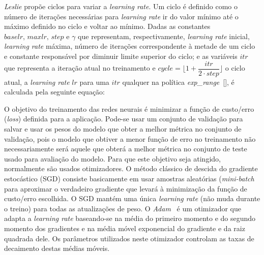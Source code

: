 \textit{Leslie} propõe ciclos para variar a \textit{learning rate}. Um ciclo é definido como o número de iterações necessárias para \textit{learning rate} ir do valor mínimo até o máximo definido no ciclo e voltar ao mínimo. Dadas as constantes $baselr,\, maxlr,\, step \text{ e } \gamma$ que representam, respectivamente, \textit{learning rate} inicial, \textit{learning rate} máxima, número de iterações correspondente à metade de um ciclo e constante responsável por diminuir limite superior do ciclo; e as variáveis $itr$ que representa a iteração atual no treinamento e $cycle = \lfloor 1 + \dfrac{itr}{2 \cdot step} \rfloor$ o ciclo atual, a \textit{learning rate} $lr$ para uma $itr$ qualquer na política \textit{exp\_range}~[], é calculada pela seguinte equação:

O objetivo do treinamento das redes neurais é minimizar a função de custo/erro (\textit{loss}) definida para a aplicação. Pode-se usar um conjunto de validação para salvar e usar os pesos do modelo que obter a melhor métrica no conjunto de validação, pois o modelo que obtiver a menor função de erro no treinamento não necessariamente será aquele que obterá a melhor métrica no conjunto de teste usado para avaliação do modelo. Para que este objetivo seja atingido, normalmente são usados otimizadores. O método clássico de descida do gradiente estocástico (\acrshort{SGD}) consiste basicamente em usar amostras aleatórias (\textit{mini-batch} para aproximar o verdadeiro gradiente que levará à minimização da função de custo/erro escolhida. O \acrshort{SGD} mantém uma única \textit{learning rate} (não muda durante o treino) para todas as atualizações de peso. O \textit{Adam}~\cite{kingma2014adam} é um otimizador que adapta a \textit{learning rate} baseando-se na média do primeiro momento e do segundo momento dos gradientes e na média móvel exponencial do gradiente e da raiz quadrada dele. Os parâmetros utilizados neste otimizador controlam as taxas de decaimento destas médias móveis.
